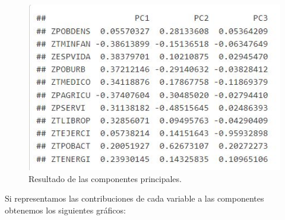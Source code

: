 \begin{figure}[H]
    \centering
    \includegraphics[scale=0.8]{PCA.JPG}
    \caption{Resultado de las componentes principales.}
\end{figure}
Si representamos las contribuciones de cada variable a las componentes obtenemos los siguientes gráficos:

